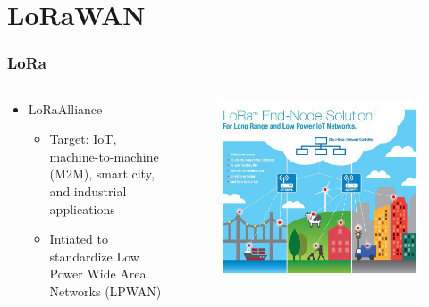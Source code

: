 \section{LoRaWAN}
  
  
\begin{frame}[fragile]
	\frametitle{LoRa\texttrademark}
	\begin{columns}
		\begin{column}{.48\linewidth}
			\begin{itemize}
				\item LoRa\texttrademark Alliance
				\begin{itemize}
					\item Target: IoT,  machine-to-machine (M2M), smart city, and industrial applications
					\item Intiated to standardize Low Power Wide Area Networks (LPWAN)
				\end{itemize}
			\end{itemize}
		\end{column}
		\hfill
		\begin{column}{.48\linewidth}
			\begin{figure}
				\centering
				\includegraphics[width=\linewidth]{img/lora.jpg}
			\end{figure}
			
		\end{column}
	\end{columns}
\end{frame}

